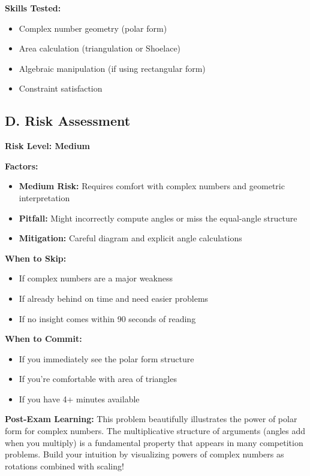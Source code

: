 \documentclass[12pt]{article}
\begin{document}
\begin{competitionbox}
\textbf{Skills Tested:}
\begin{itemize}
    \item Complex number geometry (polar form)
    \item Area calculation (triangulation or Shoelace)
    \item Algebraic manipulation (if using rectangular form)
    \item Constraint satisfaction
\end{itemize}

\subsection*{D. Risk Assessment}

\textbf{Risk Level: Medium}

\textbf{Factors:}
\begin{itemize}
    \item \textbf{Medium Risk:} Requires comfort with complex numbers and geometric interpretation
    \item \textbf{Pitfall:} Might incorrectly compute angles or miss the equal-angle structure
    \item \textbf{Mitigation:} Careful diagram and explicit angle calculations
\end{itemize}

\textbf{When to Skip:}
\begin{itemize}
    \item If complex numbers are a major weakness
    \item If already behind on time and need easier problems
    \item If no insight comes within 90 seconds of reading
\end{itemize}

\textbf{When to Commit:}
\begin{itemize}
    \item If you immediately see the polar form structure
    \item If you're comfortable with area of triangles
    \item If you have 4+ minutes available
\end{itemize}
\end{competitionbox}

\vspace{1em}

\begin{protipbox}
\textbf{Post-Exam Learning:} This problem beautifully illustrates the power of polar form for complex numbers. The multiplicative structure of arguments (angles add when you multiply) is a fundamental property that appears in many competition problems. Build your intuition by visualizing powers of complex numbers as rotations combined with scaling!
\end{protipbox}
\end{document}
